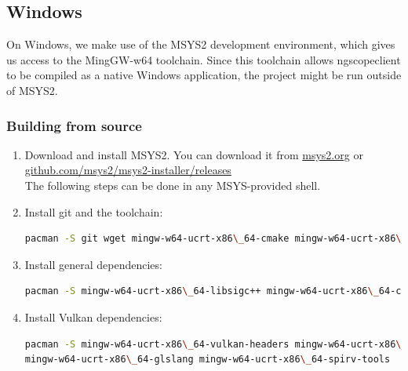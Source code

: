\subsection{Windows}

On Windows, we make use of the MSYS2 development environment, which gives us access to the MingGW-w64 toolchain.
Since this toolchain allows ngscopeclient to be compiled as a native Windows application, the project might be run
outside of MSYS2.

\subsubsection{Building from source}

\begin{enumerate}

\item Download and install MSYS2. You can download it from \href{https://www.msys2.org/}{msys2.org} or
\href{https://github.com/msys2/msys2-installer/releases}{github.com/msys2/msys2-installer/releases}\\


The following steps can be done in any MSYS-provided shell.


\item Install git and the toolchain:
\begin{lstlisting}[language=sh, numbers=none]
pacman -S git wget mingw-w64-ucrt-x86\_64-cmake mingw-w64-ucrt-x86\_64-toolchain
\end{lstlisting}

\item Install general dependencies:
\begin{lstlisting}[language=sh, numbers=none]
pacman -S mingw-w64-ucrt-x86\_64-libsigc++ mingw-w64-ucrt-x86\_64-cairomm mingw-w64-ucrt-x86\_64-yaml-cpp mingw-w64-ucrt-x86\_64-glfw mingw-w64-ucrt-x86\_64-catch
\end{lstlisting}

\item Install Vulkan dependencies:
\begin{lstlisting}[language=sh, numbers=none]
pacman -S mingw-w64-ucrt-x86\_64-vulkan-headers mingw-w64-ucrt-x86\_64-vulkan-loader mingw-w64-ucrt-x86\_64-shaderc \
mingw-w64-ucrt-x86\_64-glslang mingw-w64-ucrt-x86\_64-spirv-tools
\end{lstlisting}


\end{enumerate}
